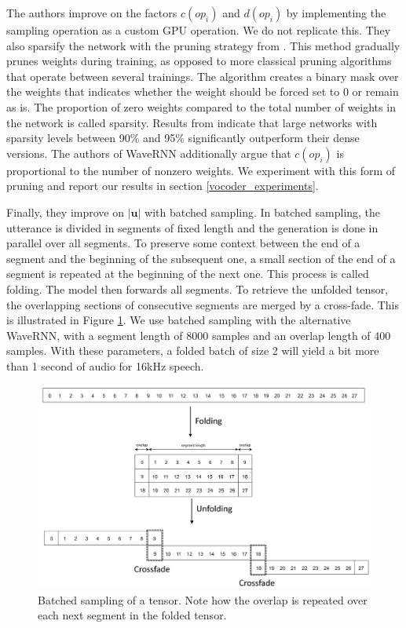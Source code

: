 \documentclass[a4paper, oneside, 12pt, english]{article}
\begin{document}
The authors improve on the factors $c(op_i)$ and $d(op_i)$ by implementing the sampling operation as a custom GPU operation. We do not replicate this. They also sparsify the network with the pruning strategy from \citep{SparsityRNN, 2PruneOrNot2Prune}. This method gradually prunes weights during training, as opposed to more classical pruning algorithms that operate between several trainings. The algorithm creates a binary mask over the weights that indicates whether the weight should be forced set to 0 or remain as is. The proportion of zero weights compared to the total number of weights in the network is called sparsity. Results from \citep{SparsityRNN, 2PruneOrNot2Prune} indicate that large networks with sparsity levels between 90\% and 95\% significantly outperform their dense versions. The authors of WaveRNN additionally argue that $c(op_i)$ is proportional to the number of nonzero weights. We experiment with this form of pruning and report our results in section \ref{vocoder_experiments}.

Finally, they improve on $|\mathbf{u}|$ with batched sampling. In batched sampling, the utterance is divided in segments of fixed length and the generation is done in parallel over all segments. To preserve some context between the end of a segment and the beginning of the subsequent one, a small section of the end of a segment is repeated at the beginning of the next one. This process is called folding. The model then forwards all segments. To retrieve the unfolded tensor, the overlapping sections of consecutive segments are merged by a cross-fade. This is illustrated in Figure \ref{batched_sampling}. We use batched sampling with the alternative WaveRNN, with a segment length of 8000 samples and an overlap length of 400 samples. With these parameters, a folded batch of size 2 will yield a bit more than 1 second of audio for 16kHz speech.

\begin{figure}[h]
	\centering
	\includegraphics[width=0.85\linewidth]{images/batched_sampling.png}
	\caption{Batched sampling of a tensor. Note how the overlap is repeated over each next segment in the folded tensor.}
	\label{batched_sampling}
\end{figure}
\end{document}
